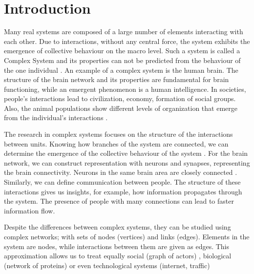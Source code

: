 \chapter{Introduction} %

Many real systems are composed of a large number of elements interacting with each other. Due to interactions, without any central force, the system exhibits the emergence of collective behaviour on the macro level\cite{kwapien2012}. Such a system is called a Complex System and its properties can not be predicted from the behaviour of the one individual \cite{ladyman2013}. An example of a complex system is the human brain. The structure of the brain network and its properties are fundamental for brain functioning, while an emergent phenomenon is a human intelligence. In societies, people's interactions lead to civilization, economy, formation of social groups. Also, the animal populations show different levels of organization that emerge from the individual's interactions \cite{boccaletti2006complex}. \cite{thurner2018} %


The research in complex systems focuses on the structure of the interactions between units. Knowing how branches of the system are connected, we can determine the emergence of the collective behaviour of the system \cite{ladyman2013}. For the brain network, we can construct representation with neurons and synapses, representing the brain connectivity. Neurons in the same brain area are closely connected \cite{latora2017complex}. Similarly, we can define communication between people. The structure of these interactions gives us insights, for example, how information propagates through the system. The presence of people with many connections can lead to faster information flow. 

Despite the differences between complex systems, they can be studied using complex networks; with sets of nodes (vertices) and links (edges). Elements in the system are nodes, while interactions between them are given as edges. This approximation allows us to treat equally social \cite{myers2014, sarigol2014} (graph of actors) , biological (network of proteins) \cite{fraiman2009ising, schneider2011modeling} or even technological systems (internet, traffic) \cite{costa2007characterization, costa2011analyzing, newman2003structure}

